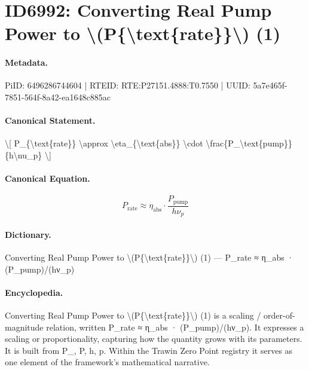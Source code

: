 \section*{ID6992: Converting Real Pump Power to \textbackslash{}(P\{\textbackslash{}text\{rate\}\}\textbackslash{}) (1)}
\paragraph{Metadata.}
PiID: 6496286744604 | RTEID: RTE:P27151.4888:T0.7550 | UUID: 5a7e465f-7851-564f-8a42-ea1648c885ac

\paragraph{Canonical Statement.}
\textbackslash{}[ P\_\{\textbackslash{}text\{rate\}\} \textbackslash{}approx \textbackslash{}eta\_\{\textbackslash{}text\{abs\}\} \textbackslash{}cdot \textbackslash{}frac\{P\_\textbackslash{}text\{pump\}\}\{h\textbackslash{}nu\_p\} \textbackslash{}]

\paragraph{Canonical Equation.}
\[
P_{\text{rate}} \approx \eta_{\text{abs}} \cdot \frac{P_\text{pump}}{h\nu_p}
\]

\paragraph{Dictionary.}
Converting Real Pump Power to \textbackslash{}(P\{\textbackslash{}text\{rate\}\}\textbackslash{}) (1) — P\_rate ≈ η\_abs · (P\_pump)/(hν\_p)

\paragraph{Encyclopedia.}
Converting Real Pump Power to \textbackslash{}(P\{\textbackslash{}text\{rate\}\}\textbackslash{}) (1) is a scaling / order-of-magnitude relation, written P\_rate ≈ η\_abs · (P\_pump)/(hν\_p). It expresses a scaling or proportionality, capturing how the quantity grows with its parameters. It is built from P\_, P, h, p. Within the Trawin Zero Point registry it serves as one element of the framework's mathematical narrative.
